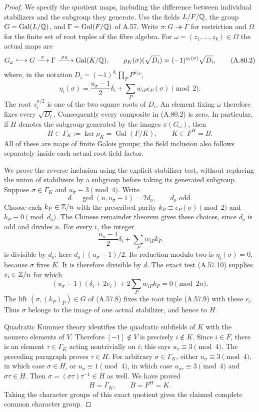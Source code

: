 \begin{proof}
We specify the quotient maps, including the difference between
individual stabilizers and the subgroup they generate.
Use the fields $L/F/\mathbb Q$, the group $G=\operatorname{Gal}(L/\mathbb Q)$,
and $\Gamma=\operatorname{Gal}(F/\mathbb Q)$ of A.57.  Write
$\pi:G\twoheadrightarrow\Gamma$ for restriction and $\Omega$
for the finite set of root tuples of the fibre algebra.
For $\omega=(z_1,\ldots,z_k)\in\Omega$ the actual maps are
\[
 G_\omega\lhook\joinrel\longrightarrow G
       \xrightarrow{\ \pi\ }\Gamma
       \xrightarrow{\ \rho_K\ }\operatorname{Gal}(K/\Q),
 \qquad
 \rho_K(\sigma)(\sqrt{D_i})
             =(-1)^{\eta_i(\sigma)}\sqrt{D_i},
 \tag{A.80.2}
\]
where, in the notation $D_i=(-1)^{\delta_i}\prod_P P^{w_{iP}}$,
\[
 \eta_i(\sigma)=
       \frac{u_\sigma-1}{2}\delta_i
             +\sum_Pw_{iP}\epsilon_P(\sigma)\pmod2.
 \tag{A.80.3}
\]
The root $z_i^{n/2}$ is one of the two square roots of $D_i$.
An element fixing $\omega$ therefore fixes every $\sqrt{D_i}$.
Consequently every composite in (A.80.2) is zero.  In particular,
if $H$ denotes the subgroup generated by the images
$\pi(G_\omega)$, then
\[
 H\subset\Gamma_K:=\ker\rho_K=\operatorname{Gal}(F/K),
 \qquad K\subset F^H=B.
 \tag{A.80.4}
\]
All of these are maps of finite Galois groups; the field inclusion
also follows separately inside each actual root-field factor.

We prove the reverse inclusion using the explicit stabilizer
test, without replacing the union of stabilizers by a subgroup
before taking its generated subgroup.  Suppose
$\sigma\in\Gamma_K$ and $u_\sigma\equiv3\pmod4$.
Write
\[
 d=\gcd(n,u_\sigma-1)=2d_o,
                  \qquad d_o\text{ odd}.
 \tag{A.80.5}
\]
Choose each $k_P\in\mathbb Z/n$ with the prescribed parity
$k_P\equiv\epsilon_P(\sigma)\pmod2$ and
$k_P\equiv0\pmod {d_o}$.  The Chinese remainder theorem
gives these choices, since $d_o$ is odd and divides $n$.
For every $i$, the integer
\[
       \frac{u_\sigma-1}{2}\delta_i+\sum_Pw_{iP}k_P
 \tag{A.80.6}
\]
is divisible by $d_o$: here $d_o\mid(u_\sigma-1)/2$.
Its reduction modulo two is $\eta_i(\sigma)=0$, because
$\sigma$ fixes $K$.  It is therefore divisible by $d$.
The exact test (A.57.10) supplies $e_i\in\mathbb Z/n$ for which
\[
 (u_\sigma-1)(\delta_i+2e_i)
                       +2\sum_Pw_{iP}k_P=0\pmod {2n}.
 \tag{A.80.7}
\]
The lift $(\sigma,(k_P)_P)\in G$ of (A.57.8) fixes the
root tuple (A.57.9) with these $e_i$.  Thus $\sigma$ belongs
to the image of one actual stabilizer, and hence to $H$.

Quadratic Kummer theory identifies the quadratic subfields of
$K$ with the nonzero elements of $V$.  Therefore
$[-1]\notin V$ is precisely $i\notin K$.
Since $i\in F$, there is an element
$\tau\in\Gamma_K$ acting nontrivially on $i$; this says
$u_\tau\equiv3\pmod4$.
The preceding paragraph proves $\tau\in H$.
For arbitrary $\sigma\in\Gamma_K$, either
$u_\sigma\equiv3\pmod4$, in which case $\sigma\in H$,
or $u_\sigma\equiv1\pmod4$, in which case
$u_{\sigma\tau}\equiv3\pmod4$ and $\sigma\tau\in H$.
Then $\sigma=(\sigma\tau)\tau^{-1}\in H$ as well.
We have proved
\[
                H=\Gamma_K,\qquad B=F^H=K.
 \tag{A.80.8}
\]
Taking the character groups of this exact quotient gives the
claimed complete common character group.


\end{proof}
